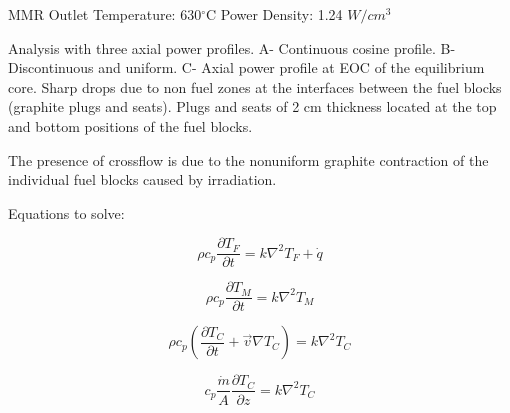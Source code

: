 MMR
Outlet Temperature: 630$^{\circ}$C
Power Density: 1.24 $W/cm^3$
\cite{usnc_mmr_2019}

Analysis with three axial power profiles.
A- Continuous cosine profile.
B- Discontinuous and uniform.
C- Axial power profile at EOC of the equilibrium core.
Sharp drops due to non fuel zones at the interfaces between the fuel blocks (graphite plugs and seats). Plugs and seats of 2 cm thickness located at the top and bottom positions of the fuel blocks.
\cite{tak_practical_2012}

The presence of crossflow is due to the nonuniform graphite contraction of the individual fuel blocks caused by irradiation.
\cite{malek_analysis_1968}

Equations to solve:

\begin{equation}
\rho c_p \frac{\partial T_F}{\partial t} = k \nabla^2 T_F + \dot{q}
\end{equation}

\begin{equation}
\rho c_p \frac{\partial T_M}{\partial t} = k \nabla^2 T_M
\end{equation}

\begin{equation}
\rho c_p (\frac{\partial T_C}{\partial t} + \vec{v} \nabla T_C) = k \nabla^2 T_C
\end{equation}

\begin{equation}
c_p  \frac{\dot{m}}{A} \frac{\partial T_C}{\partial z} = k \nabla^2 T_C
\end{equation}
